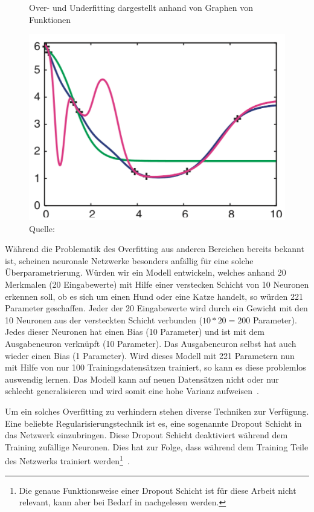 \begin{figure}[h!]
    \captionsetup{width=.9\linewidth}
    \caption{Over- und Underfitting dargestellt anhand von Graphen von Funktionen}
    \label{krogh:d}
    \centering
    \includegraphics[width=0.5\linewidth]{graphics/krogh/krogh_overfitting.png}
    \vspace*{0.2cm}
    \caption*{Quelle: \textcite{Krogh2008}}
\end{figure}

Während die Problematik des Overfitting aus anderen Bereichen bereits bekannt ist, scheinen neuronale Netzwerke besonders anfällig für eine solche Überparametrierung. Würden wir ein Modell entwickeln, welches anhand 20 Merkmalen (20 Eingabewerte) mit Hilfe einer verstecken Schicht von 10 Neuronen erkennen soll, ob es sich um einen Hund oder eine Katze handelt, so würden 221 Parameter geschaffen. Jeder der 20 Eingabewerte wird durch ein Gewicht mit den 10 Neuronen aus der versteckten Schicht verbunden ($10 * 20 = 200$ Parameter). Jedes dieser Neuronen hat einen Bias (10 Parameter) und ist mit dem Ausgabeneuron verknüpft (10 Parameter). Das Ausgabeneuron selbst hat auch wieder einen Bias (1 Parameter). Wird dieses Modell mit 221 Parametern nun mit Hilfe von nur 100 Trainingsdatensätzen trainiert, so kann es diese problemlos auswendig lernen. Das Modell kann auf neuen Datensätzen nicht oder nur schlecht generalisieren und wird somit eine hohe Varianz aufweisen~\autocite{Krogh2008}.

Um ein solches Overfitting zu verhindern stehen diverse Techniken zur Verfügung. Eine beliebte Regularisierungstechnik ist es, eine sogenannte Dropout Schicht in das Netzwerk einzubringen. Diese Dropout Schicht deaktiviert während dem Training zufällige Neuronen. Dies hat zur Folge, dass während dem Training Teile des Netzwerks trainiert werden\footnote{Die genaue Funktionsweise einer Dropout Schicht ist für diese Arbeit nicht relevant, kann aber bei Bedarf in \textcite{Goodfellow2016} nachgelesen werden.}~\autocite{Goodfellow2016}.

